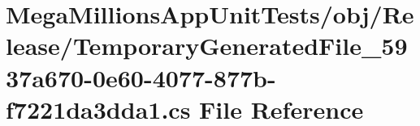\hypertarget{nit_tests_2obj_2_release_2_temporary_generated_file__5937a670-0e60-4077-877b-f7221da3dda1_8cs}{}\section{Mega\+Millions\+App\+Unit\+Tests/obj/\+Release/\+Temporary\+Generated\+File\+\_\+5937a670-\/0e60-\/4077-\/877b-\/f7221da3dda1.cs File Reference}
\label{nit_tests_2obj_2_release_2_temporary_generated_file__5937a670-0e60-4077-877b-f7221da3dda1_8cs}

